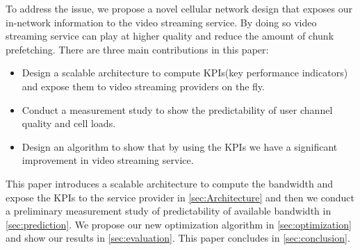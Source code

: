 To address the issue, we propose a novel cellular network design that exposes our in-network information to the video streaming service. By doing so video streaming service can play at higher quality and reduce the amount of chunk prefetching. There are three main contributions in this paper:
\begin{itemize}
\item Design a scalable architecture to compute KPIs(key performance indicators) and expose them to video streaming providers on the fly.
\item Conduct a measurement study to show the predictability of user channel quality and cell loads. 
\item Design an algorithm to show that by using the KPIs we have a significant improvement in video streaming service.
\end{itemize}

This paper introduces a scalable architecture to compute the bandwidth and expose the KPIs to the service provider in \autoref{sec:Architecture} and then we conduct a preliminary measurement study of predictability of available bandwidth in \autoref{sec:prediction}. We propose our new optimization algorithm in \autoref{sec:optimization} and show our results in \autoref{sec:evaluation}. This paper concludes in \autoref{sec:conclusion}. 



